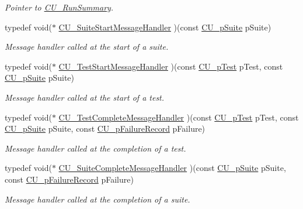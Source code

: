 \begin{DoxyCompactItemize}
\begin{DoxyCompactList}\small\item\em Pointer to \hyperlink{structCU__RunSummary}{C\-U\-\_\-\-Run\-Summary}. \end{DoxyCompactList}\item 
typedef void($\ast$ \hyperlink{group__Framework_gab7f4df4360e8d2faa7e59571a1409448}{C\-U\-\_\-\-Suite\-Start\-Message\-Handler} )(const \hyperlink{group__Framework_gaba832ae8b235f5e70d6a4ac9c3bb1219}{C\-U\-\_\-p\-Suite} p\-Suite)
\begin{DoxyCompactList}\small\item\em Message handler called at the start of a suite. \end{DoxyCompactList}\item 
typedef void($\ast$ \hyperlink{group__Framework_ga3330df7f5c95933f4ba21c648933c928}{C\-U\-\_\-\-Test\-Start\-Message\-Handler} )(const \hyperlink{group__Framework_ga249c43fbe4e53452b3f90db1437da04b}{C\-U\-\_\-p\-Test} p\-Test, const \hyperlink{group__Framework_gaba832ae8b235f5e70d6a4ac9c3bb1219}{C\-U\-\_\-p\-Suite} p\-Suite)
\begin{DoxyCompactList}\small\item\em Message handler called at the start of a test. \end{DoxyCompactList}\item 
typedef void($\ast$ \hyperlink{group__Framework_ga2c11da75531b097ca037223489bf02be}{C\-U\-\_\-\-Test\-Complete\-Message\-Handler} )(const \hyperlink{group__Framework_ga249c43fbe4e53452b3f90db1437da04b}{C\-U\-\_\-p\-Test} p\-Test, const \hyperlink{group__Framework_gaba832ae8b235f5e70d6a4ac9c3bb1219}{C\-U\-\_\-p\-Suite} p\-Suite, const \hyperlink{group__Framework_gafe3d04f76bf2fac18a3b6a9fd9368308}{C\-U\-\_\-p\-Failure\-Record} p\-Failure)
\begin{DoxyCompactList}\small\item\em Message handler called at the completion of a test. \end{DoxyCompactList}\item 
typedef void($\ast$ \hyperlink{group__Framework_gafe19dbdf8b13029d10e9463bc698be58}{C\-U\-\_\-\-Suite\-Complete\-Message\-Handler} )(const \hyperlink{group__Framework_gaba832ae8b235f5e70d6a4ac9c3bb1219}{C\-U\-\_\-p\-Suite} p\-Suite, const \hyperlink{group__Framework_gafe3d04f76bf2fac18a3b6a9fd9368308}{C\-U\-\_\-p\-Failure\-Record} p\-Failure)
\begin{DoxyCompactList}\small\item\em Message handler called at the completion of a suite. \end{DoxyCompactList}\item 

\end{DoxyCompactItemize}

